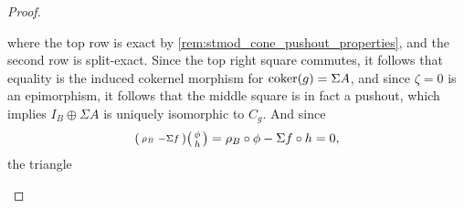 \begin{proof}
\begin{enumerate}[label={(\bfseries TR\arabic*)}]
{\begin{center}
            \end{center}
            where the top row is exact by \autoref{rem:stmod_cone_pushout_properties}, and the second row is split-exact. Since the top right square commutes, it follows that equality is the induced cokernel morphism for \( \operatorname{coker}(g) = \Sigma A \), and since \( \zeta = 0 \) is an epimorphism, it follows that the middle square is in fact a pushout, which implies \( I_B \oplus \Sigma A  \) is uniquely isomorphic to \( C_g \). %
            And since
            \[
                \begin{psmallmatrix}
                    \rho_B & -\Sigma f
                \end{psmallmatrix}
                \begin{psmallmatrix}
                    \phi \\
                    h
                \end{psmallmatrix}
                =
                \rho_B \circ \phi - \Sigma f \circ h = 0,
            \]
            the triangle
            \begin{center}
\end{center}}
\end{enumerate}
\end{proof}
